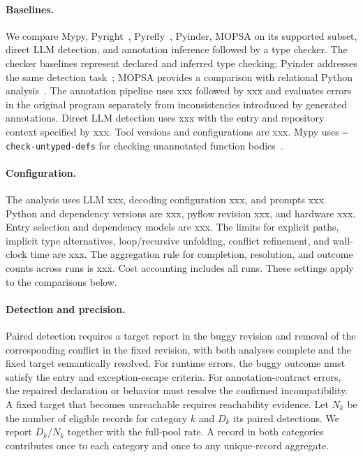 \paragraph{Baselines.}
We compare Mypy, Pyright~\cite{pyright}, Pyrefly~\cite{pyrefly}, Pyinder,
MOPSA on its supported subset,
direct LLM detection, and annotation inference followed by a type checker.
The checker baselines represent declared and inferred type checking;
Pyinder addresses the same detection task~\cite{oh2024pyinder}; MOPSA
provides a comparison with relational Python analysis~\cite{monat2020python}.
The annotation pipeline uses xxx followed by xxx and evaluates errors in
the original program separately from inconsistencies introduced by generated
annotations. Direct LLM detection uses xxx with the entry and repository
context specified by xxx. Tool versions and configurations are xxx.
Mypy uses \texttt{--check-untyped-defs} for checking unannotated function
bodies~\cite{mypyCommandLine}.

\paragraph{Configuration.}
The analysis uses LLM xxx, decoding configuration xxx, and prompts xxx.
Python and dependency versions are xxx, pyflow revision xxx, and hardware
xxx. Entry selection and dependency models are xxx. The limits for explicit
paths, implicit type alternatives, loop/recursive unfolding, conflict
refinement, and wall-clock time are xxx. The aggregation rule for completion, resolution, and outcome
counts across runs is xxx. Cost accounting includes all runs. These settings apply to the comparisons below.

\paragraph{Detection and precision.}
Paired detection requires a target report in the buggy revision and removal
of the corresponding conflict in the fixed revision, with both analyses
complete and the fixed target semantically resolved. For runtime errors,
the buggy outcome must satisfy the entry and exception-escape criteria.
For annotation-contract errors, the repaired declaration or behavior must
resolve the confirmed incompatibility. A fixed target that becomes
unreachable requires reachability evidence. Let $N_k$ be the number of
eligible records for category $k$ and $D_k$ its paired detections. We report
$D_k/N_k$ together with the full-pool rate. A record in both categories
contributes once to each category and once to any unique-record aggregate.

